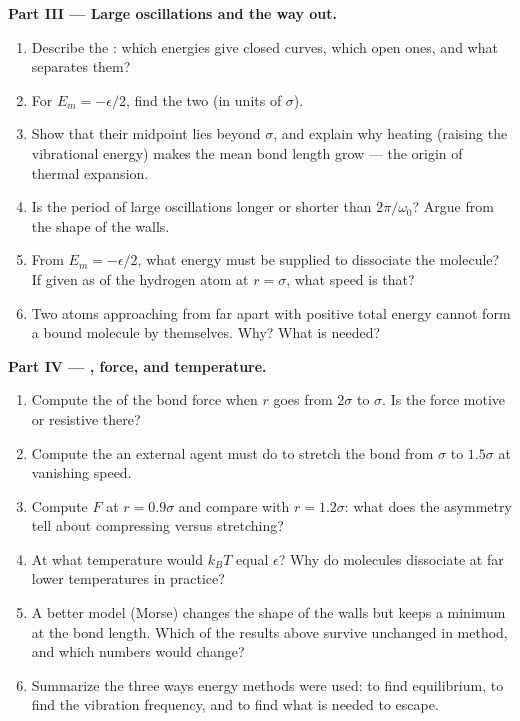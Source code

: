\begin{problem}
\medskip
\noindent\textbf{Part III --- Large oscillations and the way out.}
\begin{enumerate}[resume]
  \item Describe the : which energies give closed curves,
        which open ones, and what separates them?
  \item For $E_m = -\epsilon/2$, find the two  (in units
        of $\sigma$).
  \item Show that their midpoint lies beyond $\sigma$, and explain why
        heating (raising the vibrational energy) makes the mean bond
        length grow --- the origin of thermal expansion.
  \item Is the period of large oscillations longer or shorter than
        $2\pi/\omega_0$? Argue from the shape of the walls.
  \item From $E_m = -\epsilon/2$, what energy must be supplied to
        dissociate the molecule? If given as  of the
        hydrogen atom at $r = \sigma$, what speed is that?
  \item Two atoms approaching from far apart with positive total energy
        cannot form a bound molecule by themselves. Why? What is needed?
\end{enumerate}

\medskip
\noindent\textbf{Part IV --- , force, and temperature.}
\begin{enumerate}[resume]
  \item Compute the  of the bond force when $r$ goes from $2\sigma$
        to $\sigma$. Is the force motive or resistive there?
  \item Compute the  an external agent must do to stretch the bond
        from $\sigma$ to $1.5\sigma$ at vanishing speed.
  \item Compute $F$ at $r = 0.9\sigma$ and compare with $r = 1.2\sigma$:
        what does the asymmetry tell about compressing versus stretching?
  \item At what temperature would $k_BT$ equal $\epsilon$? Why do
        molecules dissociate at far lower temperatures in practice?
  \item A better model (Morse) changes the shape of the walls but keeps
        a minimum at the bond length. Which of the results above survive
        unchanged in method, and which numbers would change?
  \item Summarize the three ways energy methods were used: to find
        equilibrium, to find the vibration frequency, and to find what
        is needed to escape.
\end{enumerate}
\end{problem}

